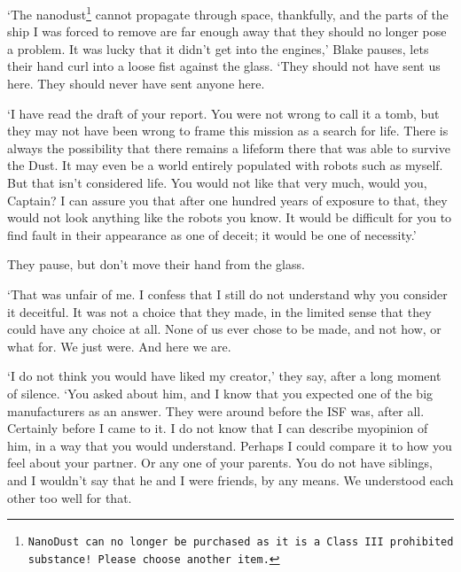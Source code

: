 `The nanodust\footnote{\texttt{NanoDust\texttrademark{} can no longer be
purchased as it is a Class III prohibited substance! Please choose
another item.}} cannot propagate through space, thankfully, and the
parts of the ship I was forced to remove are far enough away that they
should no longer pose a problem. It was lucky that it didn't get into
the engines,' Blake pauses, lets their hand curl into a loose fist
against the glass. `They should not have sent us here. They should
never have sent anyone here.

`I have read the draft of your report. You were not wrong to call it a
tomb, but they may not have been wrong to frame this mission as a
search for life. There is always the possibility that there remains a
lifeform there that was able to survive the Dust. It may even be a
world entirely populated with robots such as myself. But that isn't
considered life. You would not like that very much, would you,
Captain? I can assure you that after one hundred years of exposure to
that, they would not look anything like the robots you know. It would
be difficult for you to find fault in their appearance as one of
deceit; it would be one of necessity.'

They pause, but don't move their hand from the glass.

`That was unfair of me. I confess that I still do not understand why
you consider it deceitful. It was not a choice that they made, in the
limited sense that they could have any choice at all. None of us ever
chose to be made, and not how, or what for. We just\textemdash
were. And here we are.

`I do not think you would have liked my creator,' they say, after a
long moment of silence. `You asked about him, and I know that you
expected one of the big manufacturers as an answer. They were around
before the ISF was, after all. Certainly before I came to it. I do not
know that I can describe my\textellipsis opinion of him, in a way
that you would understand. Perhaps I could compare it to how you feel
about your partner. Or any one of your parents. You do not have
siblings, and I wouldn't say that he and I were friends, by any
means. We understood each other too well for that.

